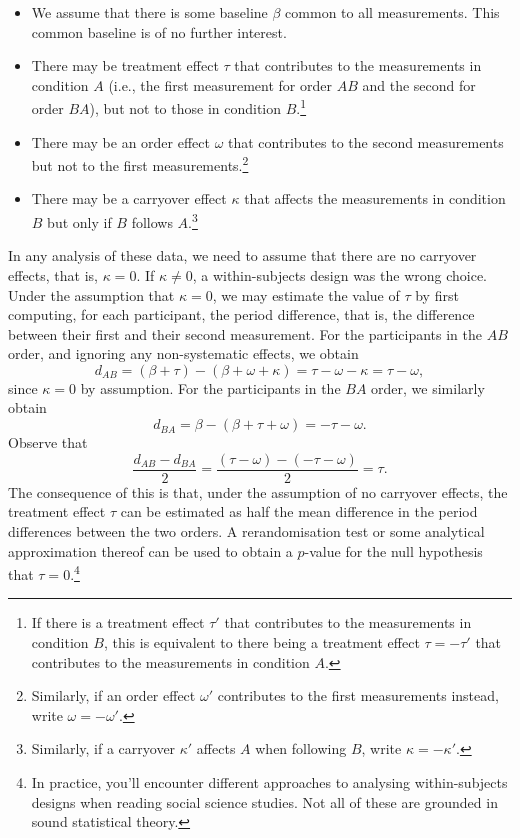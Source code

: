 \documentclass[a4paper]{tufte-book}\usepackage[]{graphicx}\usepackage[]{xcolor}
\begin{document}
\begin{itemize}
  \item We assume that there is some baseline $\beta$ common to all measurements.
        This common baseline is of no further interest.
  
  \item There may be treatment effect $\tau$ that contributes to the measurements
        in condition $A$ (i.e., the first measurement for order $AB$ and the second
        for order $BA$), but not to those in condition $B$.\footnote{If there is a treatment effect $\tau'$
        that contributes to the measurements in condition $B$, this is equivalent to there being
        a treatment effect $\tau = -\tau'$ that contributes to the measurements in condition $A$.}
        
  \item There may be an order effect $\omega$ that contributes to the second
        measurements but not to the first measurements.\footnote{Similarly, if an order effect $\omega'$
        contributes to the first measurements instead, write $\omega = -\omega'$.}
        
  \item There may be a carryover effect $\kappa$ that affects the measurements
        in condition $B$ but only if $B$ follows $A$.\footnote{Similarly, if a carryover $\kappa'$ affects
        $A$ when following $B$, write $\kappa = -\kappa'$.}
\end{itemize}

\medskip

In any analysis of these data, 
we need to assume that there are no carryover effects, that is, $\kappa = 0$.
If $\kappa \neq 0$, a within-subjects design was the wrong choice.
Under the assumption that $\kappa = 0$, we may estimate the value of $\tau$ by first computing,
for each participant, the period difference, that is, 
the difference between their first and their second measurement.
For the participants in the $AB$ order, and ignoring any non-systematic effects, we obtain
\[
  d_{AB} = (\beta + \tau) - (\beta + \omega + \kappa) = \tau - \omega - \kappa = \tau - \omega,
\]
since $\kappa = 0$ by assumption.
For the participants in the $BA$ order, we similarly obtain
\[
  d_{BA} = \beta - (\beta + \tau + \omega) = - \tau - \omega.
\]
Observe that
\[
  \frac{d_{AB} - d_{BA}}{2} = \frac{(\tau - \omega) - (- \tau - \omega)}{2} = \tau.
\]
The consequence of this is that, under the assumption of no carryover effects,
the treatment effect $\tau$ can be estimated as half the mean difference in the period
differences between the two orders.
A rerandomisation test or some analytical approximation thereof can be used to obtain a $p$-value for the null hypothesis
that $\tau = 0$.\footnote{In practice, you'll encounter different approaches to analysing within-subjects designs when reading social science studies. Not all of these
are grounded in sound statistical theory.}
\end{document}
